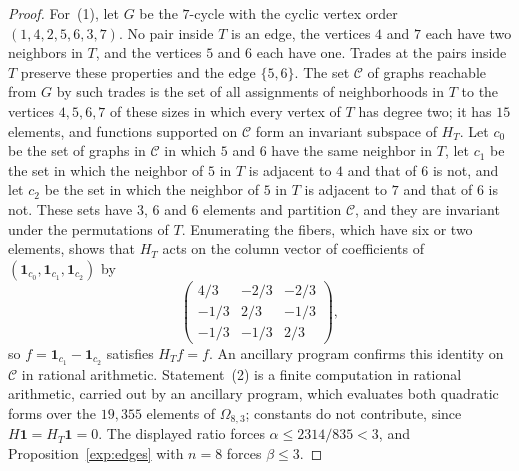 \begin{proof}
For~(1), let $G$ be the $7$-cycle with the cyclic vertex order
$(1,4,2,5,6,3,7)$. No pair inside $T$ is an edge, the vertices $4$ and $7$
each have two neighbors in $T$, and the vertices $5$ and $6$ each have one.
Trades at the pairs inside $T$ preserve these properties and the edge
$\{5,6\}$. The set $\mathcal C$ of graphs reachable from $G$ by such trades
is the set of all assignments of neighborhoods in $T$ to the vertices
$4,5,6,7$ of these sizes in which every vertex of $T$ has degree two; it has
$15$ elements, and functions supported on $\mathcal C$ form an invariant
subspace of $H_T$. Let $c_0$ be the set of graphs in $\mathcal C$ in which
$5$ and $6$ have the same neighbor in $T$, let $c_1$ be the set in which the
neighbor of $5$ in $T$ is adjacent to $4$ and that of $6$ is not, and let
$c_2$ be the set in which the neighbor of $5$ in $T$ is adjacent to $7$ and
that of $6$ is not. These sets have $3$, $6$ and $6$ elements and partition
$\mathcal C$, and they are invariant under the permutations of $T$.
Enumerating the fibers, which have six or two elements, shows that $H_T$
acts on the column vector of coefficients of
$(\mathbf1_{c_0},\mathbf1_{c_1},\mathbf1_{c_2})$ by
\[
 \begin{pmatrix}4/3&-2/3&-2/3\\-1/3&2/3&-1/3\\-1/3&-1/3&2/3\end{pmatrix},
\]
so $f=\mathbf1_{c_1}-\mathbf1_{c_2}$ satisfies $H_Tf=f$. An ancillary program
confirms this identity on $\mathcal C$ in rational arithmetic.
Statement~(2) is a finite computation in rational arithmetic, carried out
by an ancillary program, which evaluates both quadratic forms over the $19{,}355$
elements of $\Omega_{8,3}$; constants do not contribute, since
$H\mathbf1=H_T\mathbf1=0$. The displayed ratio forces $\alpha\le2314/835<3$,
and Proposition~\ref{exp:edges} with $n=8$ forces $\beta\le3$.
\end{proof}
